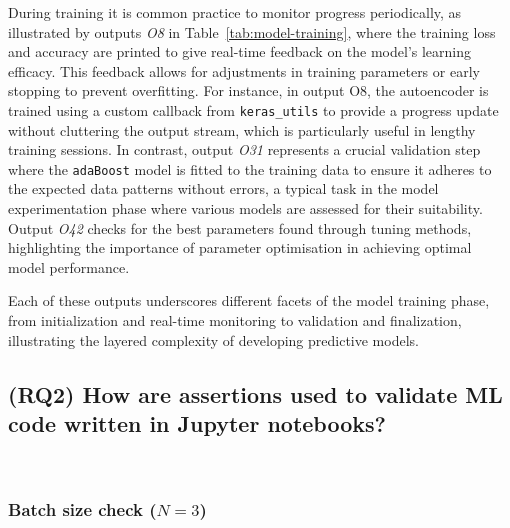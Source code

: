 During training it is common practice to monitor progress periodically, as illustrated by outputs \emph{O8} in Table~\ref{tab:model-training}, where the training loss and accuracy are printed to give real-time feedback on the model's learning efficacy. This feedback allows for adjustments in training parameters or early stopping to prevent overfitting. For instance, in output O8, the autoencoder is trained using a custom callback from \texttt{keras\_utils} to provide a progress update without cluttering the output stream, which is particularly useful in lengthy training sessions. In contrast, output \emph{O31} represents a crucial validation step where the \texttt{adaBoost} model is fitted to the training data to ensure it adheres to the expected data patterns without errors, a typical task in the model experimentation phase where various models are assessed for their suitability. Output \emph{O42} checks for the best parameters found through tuning methods, highlighting the importance of parameter optimisation in achieving optimal model performance.

Each of these outputs underscores different facets of the model training phase, from initialization and real-time monitoring to validation and finalization, illustrating the layered complexity of developing predictive models.


\subsection{(RQ2) How are assertions used to validate ML code written in Jupyter notebooks?}~\label{sec:result-rq2}


\subsubsection{Batch size check ($N = 3$)}


